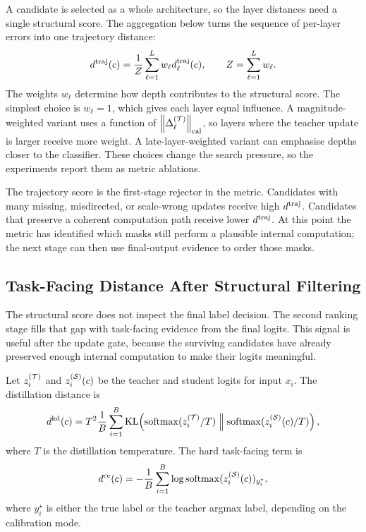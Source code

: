 A candidate is selected as a whole architecture, so the layer distances need a single structural score. The aggregation below turns the sequence of per-layer errors into one trajectory distance:
\begin{equation}
d^{\mathrm{traj}}(c)
=
\frac{1}{Z}
\sum_{\ell=1}^{L}
w_\ell
d^{\mathrm{traj}}_\ell(c),
\qquad
Z=\sum_{\ell=1}^{L}w_\ell .
\label{eq:traj_total}
\end{equation}
The weights $w_\ell$ determine how depth contributes to the structural score. The simplest choice is $w_\ell=1$, which gives each layer equal influence. A magnitude-weighted variant uses a function of $\left\lVert\Delta^{(\mathcal{T})}_{\ell}\right\rVert_{\mathrm{cal}}$, so layers where the teacher update is larger receive more weight. A late-layer-weighted variant can emphasise depths closer to the classifier. These choices change the search pressure, so the experiments report them as metric ablations.

The trajectory score is the first-stage rejector in the metric. Candidates with many missing, misdirected, or scale-wrong updates receive high $d^{\mathrm{traj}}$. Candidates that preserve a coherent computation path receive lower $d^{\mathrm{traj}}$. At this point the metric has identified which masks still perform a plausible internal computation; the next stage can then use final-output evidence to order those masks.

\subsection{Task-Facing Distance After Structural Filtering}

The structural score does not inspect the final label decision. The second ranking stage fills that gap with task-facing evidence from the final logits. This signal is useful after the update gate, because the surviving candidates have already preserved enough internal computation to make their logits meaningful.

Let $z_i^{(\mathcal{T})}$ and $z_i^{(\mathcal{S})}(c)$ be the teacher and student logits for input $x_i$. The distillation distance is
\begin{equation}
d^{\mathrm{kd}}(c)
=
T^2
\frac{1}{B}
\sum_{i=1}^{B}
\operatorname{KL}\!\left(
\operatorname{softmax}(z_i^{(\mathcal{T})}/T)
\;\middle\|\;
\operatorname{softmax}(z_i^{(\mathcal{S})}(c)/T)
\right),
\label{eq:task_kd_metric}
\end{equation}
where $T$ is the distillation temperature. The hard task-facing term is
\begin{equation}
d^{\mathrm{ce}}(c)
=
-
\frac{1}{B}
\sum_{i=1}^{B}
\log
\operatorname{softmax}(z_i^{(\mathcal{S})}(c))_{y_i^\star},
\label{eq:task_ce_metric}
\end{equation}
where $y_i^\star$ is either the true label or the teacher argmax label, depending on the calibration mode.


